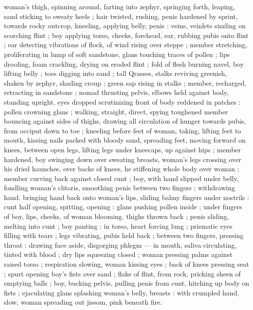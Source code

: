 woman's thigh, spinning around, farting into zephyr, springing forth, 
leaping, sand sticking to sweaty heels ; hair twisted, rushing, penis 
hardened by sprint, towards rocky outcrop, kneeling, applying belly, 
penis : veins, veinlets sizzling on scorching flint ; boy applying torso, 
cheeks, forehead, ear, rubbing pubis onto flint ; ear detecting 
vibrations of flock, of wind rising over steppe ; member stretching, 
proliferating in lump of soft sandstone, glans touching traces of 
pollen ; lips drooling, foam crackling, drying on eroded flint ; fold of 
flesh burning navel, boy lifting belly ; toes digging into sand ; tall 
Qrasses, stalks reviving greenish, shaken by zephyr, shading croup ; 
green sap rising in stalks ; member, recharged, retracting in 
sandstone ; nomad thrusting pelvis, elbows held against body, 
standing upright, eyes dropped scrutinizing front of body reddened 
in patches : pollen crowning glans ; walking, straight, direct, spying 
toughened member bouncing against sides of thighs, drawing all 
circulation of hunger towards pubis, from occiput down to toe ; 
kneeling before feet of woman, taking, lifting feet to mouth, kissing 
nails packed with bloody sand, spreading feet, moving forward on 
knees, between open legs, lifting legs under kneecaps, up against 
hips ; member hardened, boy swinging down over sweating breasts, 
woman's legs crossing over his dried haunches, over backs of knees, 
he stiffening whole body over woman ; member curving back against 
closed cunt ; boy, with hand slipped under belly, fondling woman's 
clitoris, smoothing penis between two fingers ; withdrawing hand. 
bringing hand back onto woman's lips, sliding balmy fingers under 
nostrils : cunt half opening, spitting, opening : glans pushing pollen 
inside ; under fingers of boy, lips, cheeks, of woman blooming. 
thighs thrown back ; penis sliding, melting into cunt ; boy panting : 
in torso, heart forcing lung ; prismatic eyes filling with tears ; legs 
vibrating, pubis held back ; between two fingers, pressing throat : 
drawing face aside, disgorging phlegm --- in mouth, saliva 
circulating, tinted with blood ; dry lips squeezing closed ; woman 
pressing palms against raised torso ; respiration slowing, woman 
kissing eyes ; back of knees pressing seat ; spurt opening boy's fists 
over sand ; flake of flint, from rock, pricking sheen of emptying balls 
; boy, bucking pelvis, pulling penis from cunt, hitching up body on 
fists ; ejaculating glans splashing woman's belly, breasts : with 
crumpled hand, slow, woman spreading out jissom, pink beneath fire. 
